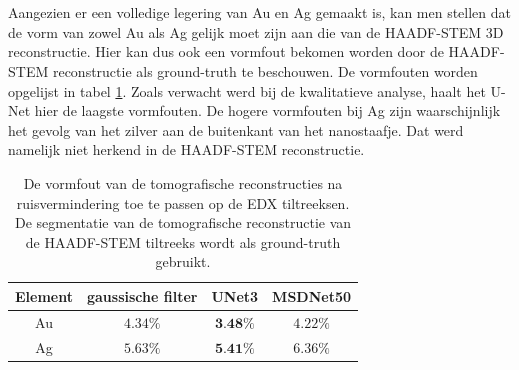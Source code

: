 \documentclass{report}
\begin{document}
\\ \\
Aangezien er een volledige legering van Au en Ag gemaakt is, kan men stellen dat de vorm van zowel Au als Ag gelijk moet zijn aan die van de HAADF-STEM 3D reconstructie. Hier kan dus ook een vormfout bekomen worden door de HAADF-STEM reconstructie als ground-truth te beschouwen. De vormfouten worden opgelijst in tabel \ref{tab:tomo_alloy}. Zoals verwacht werd bij de kwalitatieve analyse, haalt het U-Net hier de laagste vormfouten. De hogere vormfouten bij Ag zijn waarschijnlijk het gevolg van het zilver aan de buitenkant van het nanostaafje. Dat werd namelijk niet herkend in de HAADF-STEM reconstructie.
\begin{table}[h!]
	\centering
	\caption{De vormfout van de tomografische reconstructies na ruisvermindering toe te passen op de EDX tiltreeksen. De segmentatie van de tomografische reconstructie van de HAADF-STEM tiltreeks wordt als ground-truth gebruikt.}
	\begin{tabular}{|c|ccc|}
		\hline
		Element & gaussische filter & UNet3 & MSDNet50 \\
		\hline
		Au & $4.34\%$ & $\textbf{3.48}\%$ & $4.22\%$ \\
		Ag & $5.63\%$ & $\textbf{5.41}\%$ & $6.36\%$ \\
		\hline
	\end{tabular}
	\label{tab:tomo_alloy}
\end{table}
\end{document}
